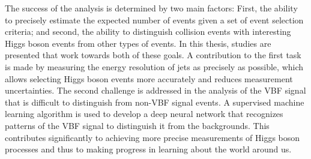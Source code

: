 The success of the \HWWdet analysis is determined by two main factors: 
First, the ability to precisely estimate the expected number of events given a set of event selection criteria; and second, the ability to distinguish collision events with interesting Higgs boson events from other types of events.
In this thesis, studies are presented that work towards both of these goals.
A contribution to the first task is made by measuring the energy resolution of jets as precisely as possible, which allows selecting Higgs boson events more accurately and reduces measurement uncertainties.
The second challenge is addressed in the analysis of the VBF signal that is difficult to distinguish from non-VBF signal events. 
A supervised machine learning algorithm is used to develop a deep neural network that recognizes patterns of the VBF signal to distinguish it from the backgrounds.
This contributes significantly to achieving more precise measurements of Higgs boson processes and thus to making progress in learning about the world around us. 




